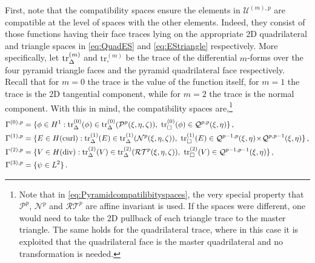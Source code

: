 First, note that the compatibility spaces ensure the elements in $\mathcal{U}^{(m),p}$ are compatible at the level of spaces with the other elements.
Indeed, they consist of those functions having their face traces lying on the appropriate 2D quadrilateral and triangle spaces in \eqref{eq:QuadES} and \eqref{eq:EStriangle} respectively.
More specifically, let $\mathrm{tr}_\Delta^{(m)}$ and $\mathrm{tr}_\square^{(m)}$ be the trace of the differential $m$-forms over the four pyramid triangle faces and the pyramid quadrilateral face respectively.
Recall that for $m=0$ the trace is the value of the function itself, for $m=1$ the trace is the 2D tangential component, while for $m=2$ the trace is the normal component.
With this in mind, the compatibility spaces are,\footnote{Note that in \eqref{eq:Pyramidcompatilibityspaces}, the very special property that $\mathcal{P}^p$, $\mathcal{N}^p$ and $\mathcal{RT}^p$ are affine invariant is used. If the spaces were different, one would need to take the 2D pullback of each triangle trace to the master triangle. The same holds for the quadrilateral trace, where in this case it is exploited that the quadrilateral face is the master quadrilateral and no transformation is needed.}
\begin{equation}
\begin{aligned}
	\Gamma^{(0),p}&=\{\phi\in H^1:\mathrm{tr}_\Delta^{(0)}(\phi)\in\mathrm{tr}_\Delta^{(0)}(\mathcal{P}^p(\xi,\eta,\zeta)),\,\,
		\mathrm{tr}_\square^{(0)}(\phi)\in\mathcal{Q}^{p,p}(\xi,\eta)\}\,,\\
	\Gamma^{(1),p}&=\{E\in H(\mathrm{curl}):\mathrm{tr}_\Delta^{(1)}(E)\in\mathrm{tr}_\Delta^{(1)}(\mathcal{N}^p(\xi,\eta,\zeta)),\,\,
		\mathrm{tr}_\square^{(1)}(E)\in\mathcal{Q}^{p-1,p}(\xi,\eta)\!\times\!\mathcal{Q}^{p,p-1}(\xi,\eta)\}\,,\\
	\Gamma^{(2),p}&=\{V\in H(\mathrm{div}):\mathrm{tr}_\Delta^{(2)}(V)\in\mathrm{tr}_\Delta^{(2)}(\mathcal{RT}^p(\xi,\eta,\zeta)),\,\,
		\mathrm{tr}_\square^{(2)}(V)\in\mathcal{Q}^{p-1,p-1}(\xi,\eta)\}\,,\\
	\Gamma^{(3),p}&=\{\psi\in L^2\}\,.
\end{aligned}
\label{eq:Pyramidcompatilibityspaces}
\end{equation}

